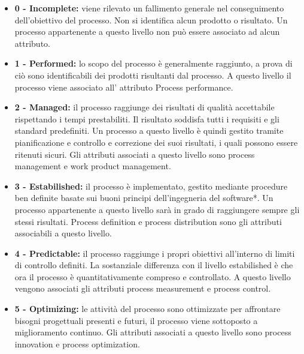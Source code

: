 	\begin{itemize}
	\item \textbf{0 - Incomplete:} viene rilevato un fallimento generale nel conseguimento dell'obiettivo del processo. Non si identifica alcun prodotto o risultato. Un processo appartenente a questo livello non può essere associato ad alcun attributo.
	\item \textbf{1 - Performed:} lo scopo del processo è generalmente raggiunto, a prova di ciò sono identificabili dei prodotti risultanti dal processo. A questo livello il processo viene associato all' attributo Process performance.
	\item \textbf{2 - Managed:} il processo raggiunge dei risultati di qualità accettabile rispettando i tempi prestabiliti. Il risultato soddisfa tutti i requisiti e gli standard predefiniti. Un processo a questo livello è quindi gestito tramite pianificazione e controllo e correzione dei suoi risultati, i quali possono essere ritenuti sicuri. Gli attributi associati a questo livello sono process management e work product management.
	\item \textbf{3 - Estabilished:} il processo è implementato, gestito mediante procedure ben definite basate sui buoni principi dell'ingegneria del software*. Un processo appartenente a questo livello sarà in grado di raggiungere sempre gli stessi risultati. Process definition e process distribution sono gli attributi associabili a questo livello.
	\item \textbf{4 - Predictable:} il processo raggiunge i propri obiettivi all'interno di limiti di controllo definiti. La sostanziale differenza con il livello estabilished è che ora il processo è quantitativamente compreso e controllato. A questo livello vengono associati gli attributi process measurement e process control.
	\item \textbf{5 - Optimizing:} le attività del processo sono ottimizzate per affrontare bisogni progettuali presenti e futuri, il processo viene sottoposto a miglioramento continuo. Gli attributi associati a questo livello sono process innovation e process optimization.
	\end{itemize}
